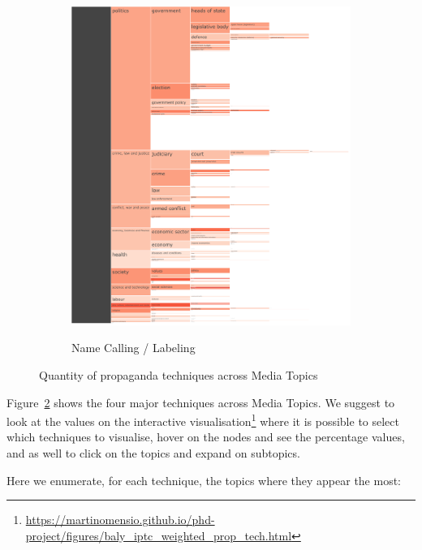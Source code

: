 \begin{figure}[!htbp]
\begin{subfigure}{0.45\textwidth}
		\href{https://martinomensio.github.io/phd-project/figures/baly_iptc_weighted_prop_tech.html#Name_Calling-Labeling}{\includegraphics[trim={2.65cm 0cm 0cm 0cm},clip,width=\linewidth]{figures/baly_iptc_weighted_prop_tech_Name_Calling-Labeling.pdf}}
		\caption{Name Calling / Labeling}
            \label{fig:baly_iptc_weighted_prop_tech_Name_Calling-Labeling}
	\end{subfigure}
	
    \caption{Quantity of propaganda techniques across Media Topics}
    \label{fig:baly_iptc_weighted_prop_tech}
\end{figure}

Figure~\ref{fig:baly_iptc_weighted_prop_tech} shows the four major techniques across Media Topics. We suggest to look at the values on the interactive visualisation\footnote{\url{https://martinomensio.github.io/phd-project/figures/baly_iptc_weighted_prop_tech.html}} where it is possible to select which techniques to visualise, hover on the nodes and see the percentage values, and as well to click on the topics and expand on subtopics.

Here we enumerate, for each technique, the topics where they appear the most:

